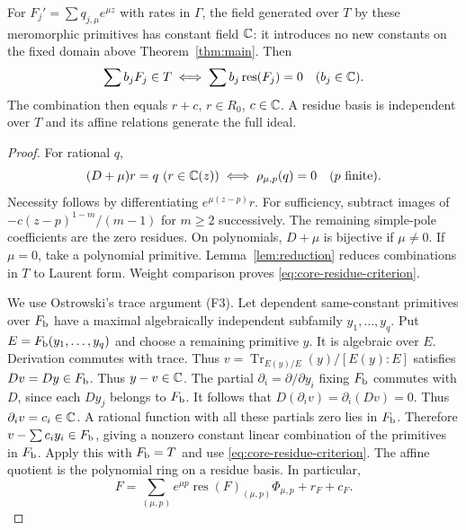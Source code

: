 \begin{lemma}\label{lem:primitive}
For $F_j'=\sum q_{j,\mu}e^{\mu z}$ with rates in $\Gamma$, the
field generated over $T$ by these meromorphic primitives has constant
field $\mathbb{C}$: it introduces no new constants on the fixed domain above
Theorem~\ref{thm:main}. Then
\begin{equation}\label{eq:core-residue-criterion}
\sum b_jF_j\in T\iff\sum b_j\operatorname{res}(F_j)=0\quad(b_j\in\mathbb{C}).
\end{equation}
The combination then equals $r+c$, $r\in R_0$, $c\in\mathbb{C}$.
A residue basis is independent over $T$ and its affine relations generate
the full ideal.
\end{lemma}
\begin{proof}
For rational $q$,
\begin{equation}\label{eq:core-rational-residue}
(D+\mu)r=q\ (r\in\mathbb{C}(z))\iff\rho_{\mu,p}(q)=0\quad(p\text{ finite}).
\end{equation}
Necessity follows by differentiating $e^{\mu(z-p)}r$. For sufficiency,
subtract images of $-c(z-p)^{1-m}/(m-1)$ for $m\ge2$ successively. The
remaining simple-pole coefficients are the zero residues. On polynomials,
$D+\mu$ is bijective if $\mu\ne0$. If $\mu=0$, take a polynomial primitive.
Lemma~\ref{lem:reduction} reduces combinations in $T$ to Laurent form. Weight comparison proves \eqref{eq:core-residue-criterion}.

We use Ostrowski's trace argument (F3). Let dependent same-constant
primitives over $F_{\rm b}$ have a maximal algebraically independent
subfamily $y_1,\ldots,y_q$.
Put $E=F_{\rm b}(y_1,\ldots,y_q)$ and choose a remaining primitive $y$.
It is algebraic over $E$. Derivation commutes with trace. Thus $v=\operatorname{Tr}_{E(y)/E}(y)/[E(y):E]$ satisfies $Dv=Dy\in F_{\rm b}$.
Thus $y-v\in\mathbb{C}$. The partial $\partial_i=\partial/\partial y_i$
fixing $F_{\rm b}$ commutes with $D$, since each $Dy_j$ belongs to $F_{\rm b}$.
It follows that $D(\partial_iv)=\partial_i(Dv)=0$. Thus $\partial_iv=c_i\in\mathbb{C}$. A rational function with all these partials
zero lies in $F_{\rm b}$. Therefore $v-\sum c_iy_i\in F_{\rm b}$, giving a nonzero
constant linear combination of the primitives in $F_{\rm b}$. Apply this with
$F_{\rm b}=T$ and use \eqref{eq:core-residue-criterion}.
The affine quotient is the polynomial ring on a residue basis. In particular,
\begin{equation}\label{eq:core-reference}
F=\sum_{(\mu,p)}e^{\mu p}\operatorname{res}(F)_{(\mu,p)}\Phi_{\mu,p}+r_F+c_F.
\end{equation}
\end{proof}

